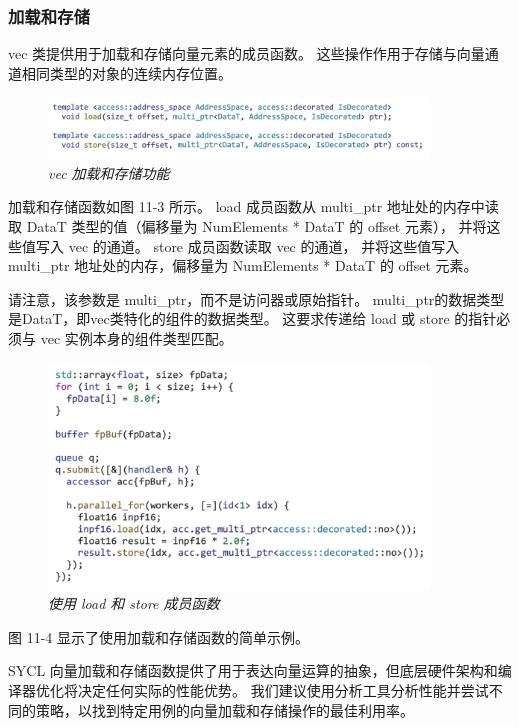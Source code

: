 \subsubsection{加载和存储}
vec 类提供用于加载和存储向量元素的成员函数。 这些操作作用于存储与向量通道相同类型的对象的连续内存位置。

\begin{figure}[H]
	\centering
	\includegraphics[width=0.9\textwidth]{figs/F11.3.png}
	\caption{\textit{vec 加载和存储功能 }}
\end{figure}

加载和存储函数如图 11-3 所示。 
load 成员函数从 multi\_ptr 地址处的内存中读取 DataT 类型的值（偏移量为 NumElements * DataT 的 offset 元素），
并将这些值写入 vec 的通道。 store 成员函数读取 vec 的通道，
并将这些值写入 multi\_ptr 地址处的内存，偏移量为 NumElements * DataT 的 offset 元素。

请注意，该参数是 multi\_ptr，而不是访问器或原始指针。 
multi\_ptr的数据类型是DataT，即vec类特化的组件的数据类型。 
这要求传递给 load 或 store 的指针必须与 vec 实例本身的组件类型匹配。

\begin{figure}[H]
	\centering
	\includegraphics[width=0.9\textwidth]{figs/F11.4.png}
	\caption{\textit{使用 load 和 store 成员函数 }}
\end{figure}

图 11-4 显示了使用加载和存储函数的简单示例。

SYCL 向量加载和存储函数提供了用于表达向量运算的抽象，但底层硬件架构和编译器优化将决定任何实际的性能优势。 
我们建议使用分析工具分析性能并尝试不同的策略，以找到特定用例的向量加载和存储操作的最佳利用率。

